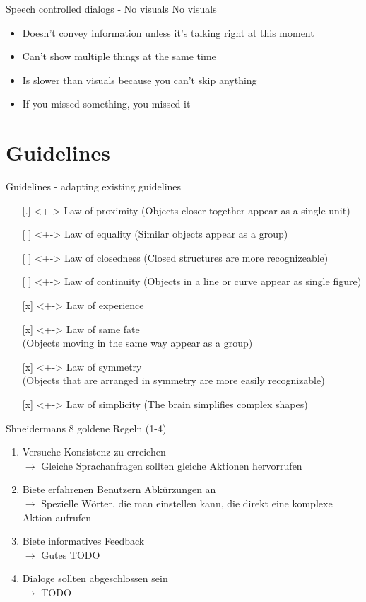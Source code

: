 \documentclass[
  10pt
, handout
]{beamer}
\begin{document}
\begin{frame}{Speech controlled dialogs - No visuals}
  No visuals

  \begin{itemize}
    \item Doesn't convey information unless it's talking right at this moment
    \item Can't show multiple things at the same time
    \item Is slower than visuals because you can't skip anything
    \item If you missed something, you missed it
  \end{itemize}
\end{frame}

\section{Guidelines}

\begin{frame}{Guidelines - adapting existing guidelines}
  \begin{itemize}
    \item[{[.]}]<+-> Law of proximity (Objects closer together appear as a single unit)
    \item[{[ ]}]<+-> Law of equality (Similar objects appear as a group)
    \item[{[ ]}]<+-> Law of closedness (Closed structures are more recognizeable)
    \item[{[ ]}]<+-> Law of continuity (Objects in a line or curve appear as single figure)
    \item[{[x]}]<+-> Law of experience
    \item[{[x]}]<+-> Law of same fate \\ (Objects moving in the same way appear as a group)
    \item[{[x]}]<+-> Law of symmetry \\ (Objects that are arranged in symmetry are more easily recognizable)
    \item[{[x]}]<+-> Law of simplicity (The brain simplifies complex shapes)
  \end{itemize}
\end{frame}

\begin{frame}{Shneidermans 8 goldene Regeln (1-4)}
  \begin{enumerate}
    \item<+-> Versuche Konsistenz zu erreichen \\ $\rightarrow$ Gleiche Sprachanfragen sollten gleiche Aktionen hervorrufen
    \item<+-> Biete erfahrenen Benutzern Abkürzungen an \\ $\rightarrow$ Spezielle Wörter, die man einstellen kann, die direkt eine komplexe Aktion aufrufen
    \item<+-> Biete informatives Feedback \\ $\rightarrow$ Gutes TODO
    \item<+-> Dialoge sollten abgeschlossen sein \\ $\rightarrow$ TODO
  \end{enumerate}
\end{frame}
\end{document}
